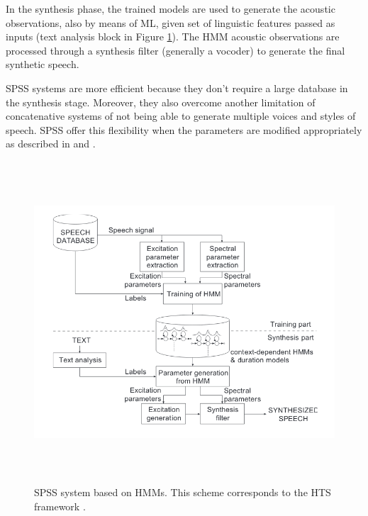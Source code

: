 In the synthesis phase, the trained models are used to generate the acoustic observations, also by means of ML, given set of linguistic features passed as inputs (text analysis block in Figure \ref{fig:hts}). The HMM acoustic observations are processed through a synthesis filter (generally a vocoder) to generate the final synthetic speech.

SPSS systems are more efficient because they don't require a large database in the synthesis stage. Moreover, they also overcome another limitation of concatenative systems of not being able to generate multiple voices and styles of speech. SPSS offer this flexibility when the parameters are modified appropriately as described in \cite{pascual2016deep} and \cite{zen2007hmm}.



\begin{figure}
    \centering
    \includegraphics[height=12cm]{figures/hts}
    \caption{SPSS system based on HMMs. This scheme corresponds to the HTS framework \cite{zen2007hmm}.}
    \label{fig:hts}
\end{figure}

